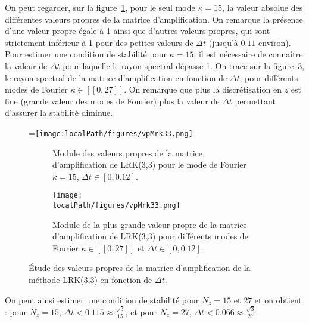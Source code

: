 On peut regarder, sur la figure~\ref{fig:3:vpMrk33_k15}, pour le seul mode $\kappa=15$, la valeur absolue des différentes valeurs propres de la matrice d'amplification. On remarque la présence d'une valeur propre égale à 1 ainsi que d'autres valeurs propres, qui sont strictement inférieur à 1 pour des petites valeurs de $\Delta t$ (jusqu'à $0.11$ environ). Pour estimer une condition de stabilité pour $\kappa=15$, il est nécessaire de connaître la valeur de $\Delta t$ pour laquelle le rayon spectral dépasse 1. On trace sur la figure~\ref{fig:3:vpMrk33}, le rayon spectral de la matrice d'amplification en fonction de $\Delta t$, pour différents modes de Fourier $\kappa\in[\![0,27]\!]$. On remarque que plus la discrétisation en $z$ est fine (grande valeur des modes de Fourier) plus la valeur de $\Delta t$ permettant d'assurer la stabilité diminue.
\begin{figure}[h]
  \centering
  =\hbox{\texttt{[image: \\localPath/figures/vpMrk33.png]}}
  \begin{subfigure}[b]{.45\linewidth}
    \caption{Module des valeurs propres de la matrice d'amplification de LRK(3,3) pour le mode de Fourier $\kappa=15$, $\Delta t\in[0,0.12]$.\\ }
    \label{fig:3:vpMrk33_k15}
  \end{subfigure}
  \begin{subfigure}[b]{.45\linewidth}
    \texttt{[image: \\localPath/figures/vpMrk33.png]}
    \caption{Module de la plus grande valeur propre de la matrice d'amplification de LRK(3,3) pour différents modes de Fourier $\kappa\in[\![0,27]\!]$ et $\Delta t\in[0,0.12]$.}
    \label{fig:3:vpMrk33}
  \end{subfigure}
  \caption{Étude des valeurs propres de la matrice d'amplification de la méthode LRK(3,3) en fonction de $\Delta t$.}
\end{figure}
On peut ainsi estimer une condition de stabilité pour $N_z = 15$ et $27$ et on obtient : pour $N_z = 15$, $\Delta t <0.115 \approx \frac{\sqrt{3}}{15}$, et pour $N_z = 27$, $\Delta t <0.066 \approx \frac{\sqrt{3}}{27}$.

